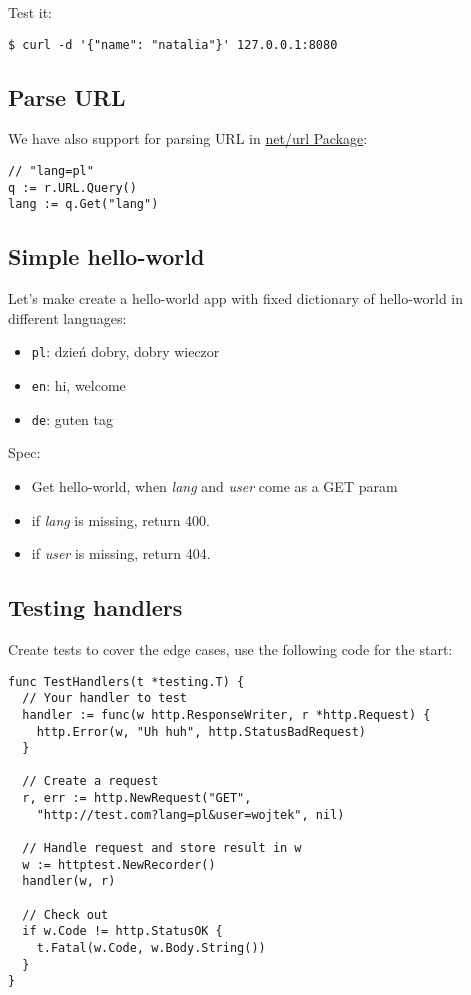 \documentclass[11pt, letterpaper]{article}
\begin{document}
Test it:

\begin{verbatim}
$ curl -d '{"name": "natalia"}' 127.0.0.1:8080 
\end{verbatim}

\subsection{Parse {\small URL}}

We have also support for parsing {\small URL} in \href{https://golang.org/pkg/net/url/}{net/url Package}:

\begin{verbatim}
// "lang=pl"
q := r.URL.Query()
lang := q.Get("lang")
\end{verbatim}

\subsection{Simple hello-world}

Let's make create a hello-world app with fixed dictionary of hello-world in different languages:

\begin{itemize}
\item \verb|pl|: dzień dobry, dobry wieczor
\item \verb|en|: hi, welcome
\item \verb|de|: guten tag
\end{itemize}

Spec:
\begin{itemize}
\item Get hello-world, when \emph{lang} and \emph{user} come as a {\small GET} param 
\item if \emph{lang} is missing, return 400.
\item if \emph{user} is missing, return 404.
\end{itemize}

\subsection{Testing handlers}

Create tests to cover the edge cases, use the following code for the start:

\begin{verbatim}
func TestHandlers(t *testing.T) {
  // Your handler to test
  handler := func(w http.ResponseWriter, r *http.Request) {
    http.Error(w, "Uh huh", http.StatusBadRequest)
  }

  // Create a request
  r, err := http.NewRequest("GET",
    "http://test.com?lang=pl&user=wojtek", nil)

  // Handle request and store result in w
  w := httptest.NewRecorder()
  handler(w, r)

  // Check out
  if w.Code != http.StatusOK {
    t.Fatal(w.Code, w.Body.String())
  }
}
\end{verbatim}
\end{document}
